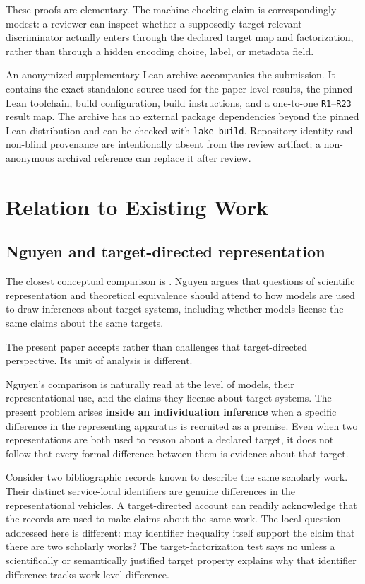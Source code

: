 \documentclass[11pt]{article}
\begin{document}
These proofs are elementary. The machine-checking claim is correspondingly modest: a reviewer can inspect whether a supposedly target-relevant discriminator actually enters through the declared target map and factorization, rather than through a hidden encoding choice, label, or metadata field.

An anonymized supplementary Lean archive accompanies the submission. It contains the exact standalone source used for the paper-level results, the pinned Lean toolchain, build configuration, build instructions, and a one-to-one \texttt{R1}--\texttt{R23} result map. The archive has no external package dependencies beyond the pinned Lean distribution and can be checked with \texttt{lake build}. Repository identity and non-blind provenance are intentionally absent from the review artifact; a non-anonymous archival reference can replace it after review.

\section{Relation to Existing Work}

\subsection{Nguyen and target-directed representation}

The closest conceptual comparison is \citet{Nguyen2017RepresentationEquivalence}. Nguyen argues that questions of scientific representation and theoretical equivalence should attend to how models are used to draw inferences about target systems, including whether models license the same claims about the same targets.

The present paper accepts rather than challenges that target-directed perspective. Its unit of analysis is different.

Nguyen's comparison is naturally read at the level of models, their representational use, and the claims they license about target systems. The present problem arises \textbf{inside an individuation inference} when a specific difference in the representing apparatus is recruited as a premise. Even when two representations are both used to reason about a declared target, it does not follow that every formal difference between them is evidence about that target.

Consider two bibliographic records known to describe the same scholarly work. Their distinct service-local identifiers are genuine differences in the representational vehicles. A target-directed account can readily acknowledge that the records are used to make claims about the same work. The local question addressed here is different: may identifier inequality itself support the claim that there are two scholarly works? The target-factorization test says no unless a scientifically or semantically justified target property explains why that identifier difference tracks work-level difference.
\end{document}
